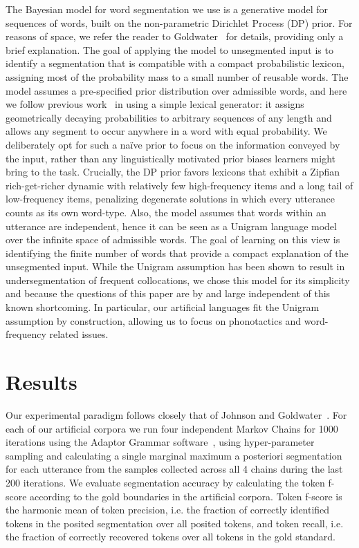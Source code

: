 \documentclass[11pt]{article}
\begin{document}
The Bayesian model for word segmentation we use is a generative model for sequences of words, built on the non-parametric Dirichlet Process (DP) prior. For reasons of space, we refer the reader to Goldwater~ for details, providing only a brief explanation. The goal of applying the model to unsegmented input is to identify a segmentation that is compatible with a compact probabilistic lexicon, assigning most of the probability mass to a small number of reusable words. The model assumes a pre-specified prior distribution over admissible words, and here we follow previous work~\cite{Brent99a,Goldwater07c} in using a simple lexical generator: it assigns geometrically decaying probabilities to arbitrary sequences of any length and allows any segment to occur anywhere in a word with equal probability. We deliberately opt for such a na\"{i}ve prior to focus on the information conveyed by the input, rather than any linguistically motivated prior biases learners might bring to the task. Crucially, the DP prior favors lexicons that exhibit a Zipfian rich-get-richer dynamic with relatively few high-frequency items and a long tail of low-frequency items, penalizing degenerate solutions in which every utterance counts as its own word-type. Also, the model assumes that words within an utterance are independent, hence it can be seen as a Unigram language model over the infinite space of admissible words. The goal of learning on this view is identifying the finite number of words that provide a compact explanation of the unsegmented input. While the Unigram assumption has been shown to result in undersegmentation of frequent collocations, we chose this model for its simplicity and because the questions of this paper are by and large independent of this known shortcoming. In particular, our artificial languages fit the Unigram assumption by construction, allowing us to focus on phonotactics and word-frequency related issues.

\section{Results}
\vspace*{-5pt}
Our experimental paradigm follows closely that of Johnson and Goldwater~. For each of our artificial corpora we run four independent Markov Chains for 1000 iterations using the Adaptor Grammar software~\cite{Johnson07c}, using hyper-parameter sampling and calculating a single marginal maximum a posteriori segmentation for each utterance from the samples collected across all 4 chains during the last 200 iterations. We evaluate segmentation accuracy by calculating the token f-score according to the gold boundaries in the artificial corpora. Token f-score is the harmonic mean of token precision, i.e. the fraction of correctly identified tokens in the posited segmentation over all posited tokens, and token recall, i.e. the fraction of correctly recovered tokens over all tokens in the gold standard. 
\end{document}

